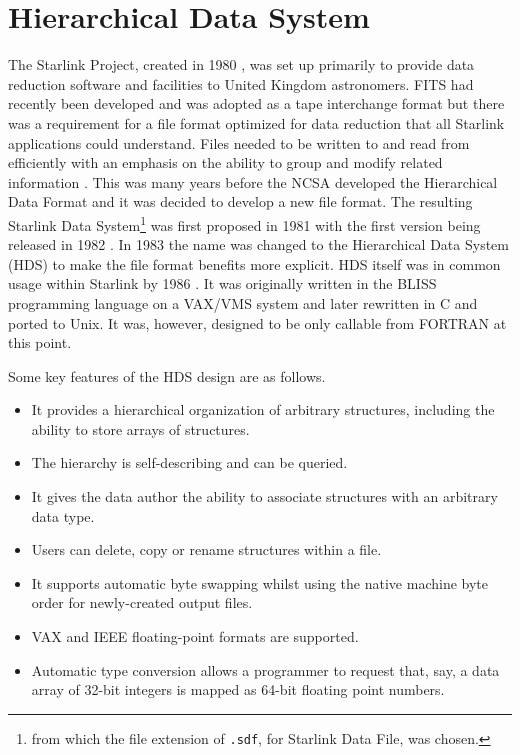 \documentclass[final,authoryear,5p,times,twocolumn]{elsarticle}
\begin{document}
\section{Hierarchical Data System}
\label{sec:hds}

The Starlink Project, created in 1980
\citep{1980IrAJ...14..197E,1982MmSAI..53...55T,1982QJRAS..23..485D}, was set up
primarily to provide data reduction software and facilities to United
Kingdom astronomers. FITS
\citep{1979ipia.coll..445W,1981A&AS...44..363W} had recently been
developed and was adopted as a tape interchange format but there was a
requirement for a file format optimized for data reduction that all
Starlink applications could understand. Files
needed to be written to and read from efficiently with an emphasis on the
ability to group and modify related information
\citep{1981STARENT4}. This was many years before the NCSA developed
the Hierarchical Data Format \citep{HDF1,Folk2010} and it was decided
to develop a new file format. The resulting Starlink Data
System\footnote{from which the file extension of \texttt{.sdf}, for
  Starlink Data File, was chosen.} was first proposed in 1981 with the
first version being released in 1982 \citep[see
e.g.][]{1982QJRAS..23..485D,1991STARB...8....2L}. In 1983 the name was
changed to the Hierarchical Data System (HDS) to make the file format
benefits more explicit. HDS itself was in common usage within Starlink by 1986
\citep{1986BICDS..30...13L}. It was originally written in the BLISS
programming language on a VAX/VMS system and later rewritten in C and
ported to Unix.
It was, however, designed to be only callable from FORTRAN at this point.

Some key features of the HDS design are as follows.
\begin{itemize}
\item It provides a hierarchical organization of arbitrary structures, including the
  ability to store arrays of structures.
\item The hierarchy is self-describing and can be queried.
\item It gives the data author the ability to associate structures with an arbitrary data type.
\item Users can delete, copy or rename structures within a file.
\item It supports automatic byte swapping whilst using the native machine byte order
  for newly-created output files.
\item VAX and IEEE floating-point formats are supported.
\item Automatic type conversion allows a programmer to request that,
  say, a data array of 32-bit integers is mapped as 64-bit floating
  point numbers.
\end{itemize}
\end{document}
